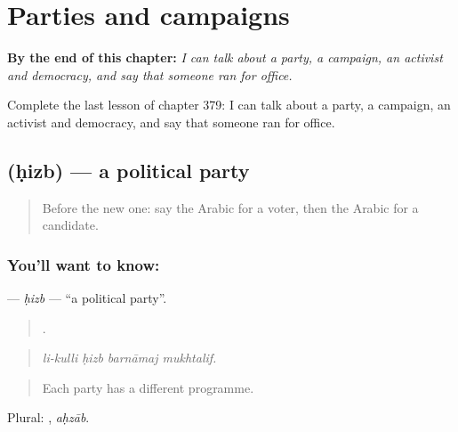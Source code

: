 
\chapter{Parties and campaigns}
\label{ch:ar-parties-and-campaigns}

\begin{chapteropening}
\textbf{By the end of this chapter:} \emph{I can talk about a party, a campaign, an activist and democracy, and say that someone ran for office.}

Complete the last lesson of chapter 379: I can talk about a party, a campaign, an activist and democracy, and say that someone ran for office.
\end{chapteropening}

\section[\texorpdfstring{\ar{حزب} (ḥizb)}{حزب (ḥizb)}]{ (ḥizb) — a political party}

\label{lesson:AR-C379-hizb}



\begin{quote}
Before the new one: say the Arabic for a voter, then the Arabic for a candidate.
\end{quote}

\subsection*{You'll want to know: }
\textbf{} — \emph{ḥizb} — \textquotedblleft{}a political party\textquotedblright{}.

\begin{quote}
   .
\end{quote}

\begin{quote}
\emph{li-kulli ḥizb barnāmaj mukhtalif.}
\end{quote}

\begin{quote}
Each party has a different programme.
\end{quote}

Plural: , \emph{aḥzāb}.

